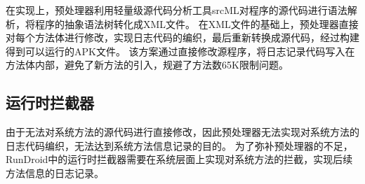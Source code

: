 在实现上，预处理器利用轻量级源代码分析工具srcML\cite{collard2013srcml}对程序的源代码进行语法解析，将程序的抽象语法树转化成XML文件。
在XML文件的基础上，预处理器直接对每个方法体进行修改，实现日志代码的编织，最后重新转换成源代码，经过构建得到可以运行的APK文件。
该方案通过直接修改源程序，将日志记录代码写入在方法体内部，避免了新方法的引入，规避了方法数65K限制问题。


\subsection{运行时拦截器}%

由于无法对系统方法的源代码进行直接修改，因此预处理器无法实现对系统方法的日志代码编织，无法达到系统方法信息记录的目的。
为了弥补预处理器的不足，RunDroid中的运行时拦截器需要在系统层面上实现对系统方法的拦截，实现后续方法信息的日志记录。







